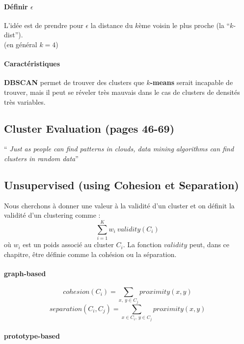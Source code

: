 \documentclass{article}
\newcommand{\quotecolor}[1]{\textcolor{quote}{#1}}
\begin{document}
\begin{sffamily}
\paragraph{Définir $\epsilon$} L'idée est de prendre pour $\epsilon$ la distance du $k$ème voisin le plus proche (la ``$k$-dist'').\\ (en 
général $k=4$)

\paragraph{Caractéristiques} \textbf{DBSCAN} permet de trouver des clusters que \textbf{$k$-means} serait incapable de trouver, mais il 
peut se réveler très mauvais dans le cas de clusters de densités très variables.

\subsection{Cluster Evaluation (pages 46-69)}

\begin{center}\begin{Large}\quotecolor{``} \textit{Just as people can find patterns in clouds, data mining algorithms can find clusters in 
random data}\quotecolor{''}\end{Large}\end{center}

\subsection{Unsupervised (using Cohesion et Separation)}

Nous cherchons à donner une valeur à la validité d'un cluster et on définit la validité d'un clustering comme :
$$ \sum_{i=1}^K w_i\ validity(C_i)$$
où $w_i$ est un poids associé au cluster $C_i$. La fonction $validity$ peut, dans ce chapitre, être définie comme la cohésion ou la 
séparation.

\paragraph{graph-based}

$$cohesion(C_i) = \sum_{x,\ y\in C_j} proximity(x,y)$$
$$separation(C_i,C_j) = \sum_{x\in C_i,\ y\in C_j} proximity(x,y)$$

\paragraph{prototype-based}


\end{sffamily}
\end{document}
